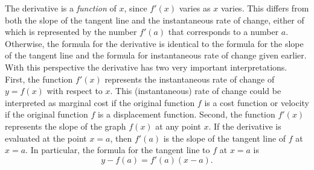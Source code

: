 \documentclass{book}
\begin{document}
 The derivative is a \emph{function} of $x$, since $f'(x)$ varies as $x$ varies. This differs from both the slope of the tangent line and the instantaneous rate of change, either of which is represented by the number $f'(a)$ that corresponds to a number $a$. Otherwise, the formula for the derivative is identical to the formula for the slope of the tangent line and the formula for instantaneous rate of change given earlier.\\

With this perspective the derivative has two very important interpretations. First, the function $f'(x)$ represents the instantaneous rate of change of $y=f(x)$ with respect to $x$. This (instantaneous) rate of change could be interpreted as marginal cost if the original function $f$ is a cost function or velocity if the original function $f$ is a displacement function. Second, the function $f'(x)$ represents the slope of the graph $f(x)$ at any point $x$. If the derivative is evaluated at the point $x=a$, then $f'(a)$ is the slope of the tangent line of $f$ at $x=a$.  In particular, the formula for the tangent line to $f$ at $x=a$ is \begin{equation} y - f(a) = f'(a)(x-a). \end{equation}
\end{document}
